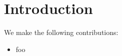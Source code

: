 \section{Introduction}

We make the following contributions:
%
\begin{itemize}
\item foo
\end{itemize}
